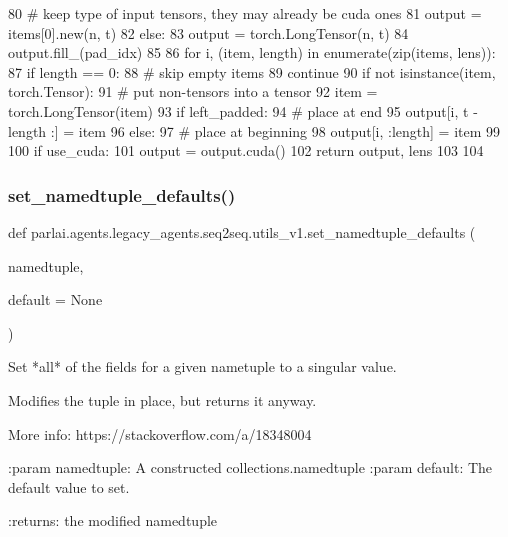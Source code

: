 \begin{DoxyCode}
80         \textcolor{comment}{# keep type of input tensors, they may already be cuda ones}
81         output = items[0].new(n, t)
82     \textcolor{keywordflow}{else}:
83         output = torch.LongTensor(n, t)
84     output.fill\_(pad\_idx)
85 
86     \textcolor{keywordflow}{for} i, (item, length) \textcolor{keywordflow}{in} enumerate(zip(items, lens)):
87         \textcolor{keywordflow}{if} length == 0:
88             \textcolor{comment}{# skip empty items}
89             \textcolor{keywordflow}{continue}
90         \textcolor{keywordflow}{if} \textcolor{keywordflow}{not} isinstance(item, torch.Tensor):
91             \textcolor{comment}{# put non-tensors into a tensor}
92             item = torch.LongTensor(item)
93         \textcolor{keywordflow}{if} left\_padded:
94             \textcolor{comment}{# place at end}
95             output[i, t - length :] = item
96         \textcolor{keywordflow}{else}:
97             \textcolor{comment}{# place at beginning}
98             output[i, :length] = item
99 
100     \textcolor{keywordflow}{if} use\_cuda:
101         output = output.cuda()
102     \textcolor{keywordflow}{return} output, lens
103 
104 
\end{DoxyCode}
\mbox{\label{namespaceparlai_1_1agents_1_1legacy__agents_1_1seq2seq_1_1utils__v1_a17553492abb2e671bc3fc58e1e3a96b0}} 
\subsubsection{\texorpdfstring{set\+\_\+namedtuple\+\_\+defaults()}{set\_namedtuple\_defaults()}}
{\footnotesize\ttfamily def parlai.\+agents.\+legacy\+\_\+agents.\+seq2seq.\+utils\+\_\+v1.\+set\+\_\+namedtuple\+\_\+defaults (\begin{DoxyParamCaption}\item[{}]{namedtuple,  }\item[{}]{default = {\ttfamily None} }\end{DoxyParamCaption})}

\begin{DoxyVerb}Set *all* of the fields for a given nametuple to a singular value.

Modifies the tuple in place, but returns it anyway.

More info:
https://stackoverflow.com/a/18348004

:param namedtuple: A constructed collections.namedtuple
:param default: The default value to set.

:returns: the modified namedtuple
\end{DoxyVerb}
 

